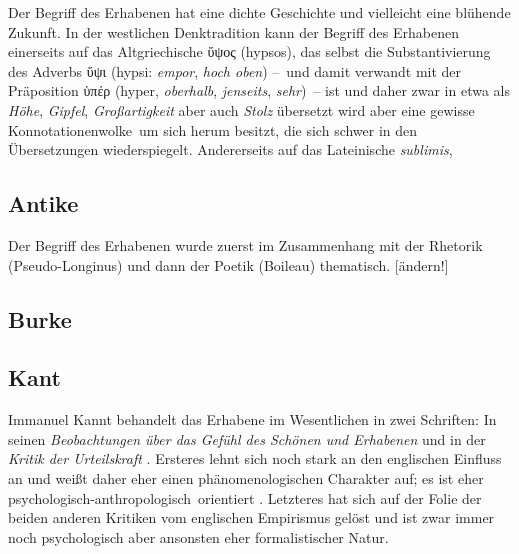 Der Begriff des Erhabenen hat eine dichte Geschichte und vielleicht eine
  blühende Zukunft.
In der westlichen Denktradition kann der Begriff des Erhabenen einerseits auf das
  Altgriechische \textgreek{ὕψος} (hypsos), das selbst die Substantivierung des
  Adverbs \textgreek{ὕψι} (hypsi: \emph{empor}, \emph{hoch oben}) --~und damit
  verwandt mit der Präposition \textgreek{ὑπέρ} (hyper, \emph{oberhalb},
  \emph{jenseits}, \emph{sehr})~-- ist und daher zwar in etwa als \emph{Höhe},
  \emph{Gipfel}, \emph{Großartigkeit} aber auch \emph{Stolz} übersetzt wird
  aber eine gewisse \glqq Konnotationenwolke\grqq\ um sich herum besitzt, die
  sich schwer in den Übersetzungen wiederspiegelt.
Andererseits auf das Lateinische \emph{sublimis}, 


\subsection{Antike}
Der Begriff des Erhabenen wurde zuerst im Zusammenhang mit der Rhetorik
(Pseudo-Longinus) und dann der Poetik (Boileau) thematisch. [ändern!]

\subsection{Burke}

\subsection{Kant}

Immanuel Kannt behandelt das Erhabene im Wesentlichen in zwei Schriften:
  In seinen \emph{Beobachtungen über das Gefühl des Schönen und
  Erhabenen} \citep{Kant1764} und in der \emph{Kritik der Urteilskraft}
  \citep{Kant1790}.
Ersteres lehnt sich noch stark an den englischen Einfluss an und weißt daher
  eher einen phänomenologischen Charakter auf; es ist eher \glqq
  psychologisch-anthropologisch\grqq\ orientiert \citep[S. 125]{Bertinetto2007}.
Letzteres hat sich auf der Folie der beiden anderen Kritiken vom englischen
  Empirismus gelöst und ist zwar immer noch psychologisch aber ansonsten eher
  formalistischer Natur.

